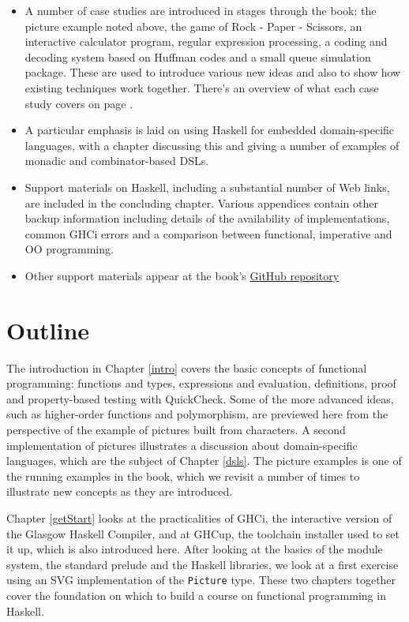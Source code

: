 \begin{itemize}
intended, but also we view types as the single most important piece of
documentation for a definition, since a function's type describes precisely how
the function is to be used.
\item
A number of case studies are introduced in stages through the book: the
picture example noted above, the game of Rock - Paper - Scissors, an interactive calculator program, regular expression processing, a coding
and decoding system based on Huffman codes and a small queue simulation 
package. These are used to introduce various new ideas and also to show
how existing techniques work together. There's an overview of what each case study covers on page \pageref{CaseStudies}.
\item
A particular emphasis is laid on using Haskell for embedded domain-specific languages, with a chapter discussing this and giving a number of examples of monadic and combinator-based DSLs.
\item 
Support materials on Haskell, including a substantial number of Web
links, are included in the concluding chapter. Various appendices
contain other backup information
including details of the availability of implementations, common GHCi
errors and a comparison between functional, imperative and OO
programming. 
\item
Other support materials appear at the book's \href{https://github.com/simonjohnthompson/haskellcraft}{GitHub repository}
\end{itemize}

\section*{Outline}

The introduction in Chapter \ref{intro} covers the basic concepts of
functional programming: functions and types, expressions and evaluation,
definitions, proof and property-based testing with QuickCheck. Some of the more advanced ideas, such as 
higher-order functions and polymorphism, are previewed here from the
perspective of the example of pictures built from characters. A second implementation of pictures illustrates a discussion about domain-specific languages, which are the subject of Chapter \ref{dsls}. The picture examples is one of the running examples in the book, which we revisit a number of times to illustrate new concepts as they are introduced.

Chapter \ref{getStart} looks at the practicalities of GHCi, the interactive version of the Glasgow Haskell Compiler, and at GHCup, the toolchain installer used to set it up, which is also introduced here. After looking at the basics of the module system, the standard prelude and the Haskell libraries, we look at a  first exercise using an SVG implementation of the \texttt{Picture} type. These
two chapters together cover the foundation on which to build a course on
functional programming in Haskell.

